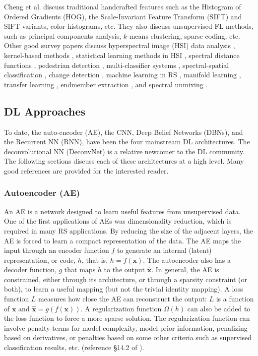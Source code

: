 \documentclass[12pt]{spieman}
\begin{document}
\begin{spacing}{1}
Cheng et al. \cite{Cheng} discuss traditional handcrafted features such as the Histogram of Ordered Gradients (HOG), the Scale-Invariant Feature Transform (SIFT) and SIFT variants, color histograms, etc. They also discuss unsupervised FL methods, such as principal components analysis, $k$-means clustering, sparse coding, etc. Other good survey papers discuss hyperspectral image (HSI) data analysis \cite{Bioucas-dias2013} , kernel-based methods \cite{Camps-Valls2005Kernel} , statistical learning methods in HSI \cite{camps2013advances} , spectral distance functions \cite{deborah2015comprehensive} , pedestrian detection \cite{dollar2012pedestrian} , multi-classifier systems \cite{du2012multiple} , spectral-spatial classification \cite{fauvel2013advances} , change detection \cite{hussain2013change, jianya2008review} , machine learning in RS \cite{lary2016machine} , manifold learning \cite{lunga2014manifold} , transfer learning \cite{pan2010survey} , endmember extraction \cite{plaza2004quantitative} , and spectral unmixing \cite{keshava2002spectral, keshava2003survey, parente2010survey, plaza2011recent, shi2014incorporating} .

\subsection{DL Approaches}
To date, the auto-encoder (AE), the CNN, Deep Belief Networks (DBNs), and the Recurrent NN (RNN), have been the four mainstream DL architectures. The deconvolutional NN (DeconvNet) is a relative newcomer to the DL community. The following sections discuss each of these architectures at a high level. Many good references are provided for the interested reader.

\subsubsection{Autoencoder (AE)}
An AE is a network designed to learn useful features from unsupervised data. One of the first applications of AEs was dimensionality reduction, which is required in many RS applications. By reducing the size of the adjacent layers, the AE is forced to learn a compact representation of the data. The AE maps the input through an encoder function $f$ to generate an internal (latent) representation, or code, $h$, that is, $h = f(\textbf{x})$. The autoencoder also has a decoder function, $g$ that maps $h$ to the output $\hat{\textbf{x}}$. In general, the AE is constrained, either through its architecture, or through a sparsity constraint (or both), to learn a useful mapping (but not the trivial identity mapping). A loss function $L$ measures how close the AE can reconstruct the output: $L$ is a function of $\textbf{x}$ and $\hat{\textbf{x}} = g(f(\textbf{x}))$. A regularization function $\Omega(h)$ can also be added to the loss function to force a more sparse solution. The regularization function can involve penalty terms for model complexity, model prior information, penalizing based on derivatives, or penalties based on some other criteria such as supervised classification results, etc. (reference \S 14.2 of \cite{goodfellow2016deep} ).


\end{spacing}
\end{document}
